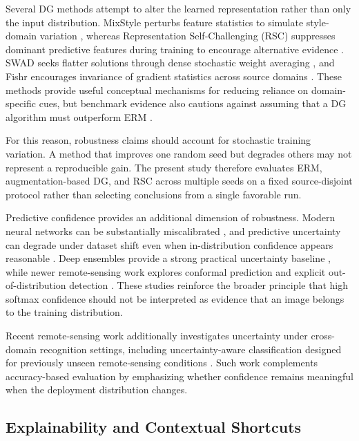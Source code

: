 Several DG methods attempt to alter the learned representation rather than only the input distribution. MixStyle perturbs feature statistics to simulate style-domain variation \cite{zhou2021mixstyle}, whereas Representation Self-Challenging (RSC) suppresses dominant predictive features during training to encourage alternative evidence \cite{huang2020rsc}. SWAD seeks flatter solutions through dense stochastic weight averaging \cite{cha2021swad}, and Fishr encourages invariance of gradient statistics across source domains \cite{rame2022fishr}. These methods provide useful conceptual mechanisms for reducing reliance on domain-specific cues, but benchmark evidence also cautions against assuming that a DG algorithm must outperform ERM \cite{gulrajani2021domainbed}.

For this reason, robustness claims should account for stochastic training variation. A method that improves one random seed but degrades others may not represent a reproducible gain. The present study therefore evaluates ERM, augmentation-based DG, and RSC across multiple seeds on a fixed source-disjoint protocol rather than selecting conclusions from a single favorable run.

Predictive confidence provides an additional dimension of robustness. Modern neural networks can be substantially miscalibrated \cite{guo2017calibration}, and predictive uncertainty can degrade under dataset shift even when in-distribution confidence appears reasonable \cite{ovadia2019uncertainty}. Deep ensembles provide a strong practical uncertainty baseline \cite{lakshminarayanan2017ensembles}, while newer remote-sensing work explores conformal prediction and explicit out-of-distribution detection \cite{schweden2026conformal,zhou2026sarood}. These studies reinforce the broader principle that high softmax confidence should not be interpreted as evidence that an image belongs to the training distribution.

Recent remote-sensing work additionally investigates uncertainty under cross-domain recognition settings, including uncertainty-aware classification designed for previously unseen remote-sensing conditions \cite{ning2026uncertainty}. Such work complements accuracy-based evaluation by emphasizing whether confidence remains meaningful when the deployment distribution changes.


\subsection{Explainability and Contextual Shortcuts}

